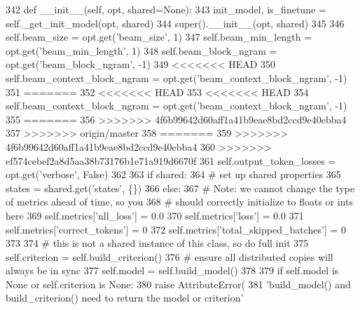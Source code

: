 \begin{DoxyCode}
342     \textcolor{keyword}{def }\_\_init\_\_(self, opt, shared=None):
343         init\_model, is\_finetune = self.\_get\_init\_model(opt, shared)
344         super().\_\_init\_\_(opt, shared)
345 
346         self.beam\_size = opt.get(\textcolor{stringliteral}{'beam\_size'}, 1)
347         self.beam\_min\_length = opt.get(\textcolor{stringliteral}{'beam\_min\_length'}, 1)
348         self.beam\_block\_ngram = opt.get(\textcolor{stringliteral}{'beam\_block\_ngram'}, -1)
349 <<<<<<< HEAD
350         self.beam\_context\_block\_ngram = opt.get(\textcolor{stringliteral}{'beam\_context\_block\_ngram'}, -1)
351 =======
352 <<<<<<< HEAD
353 <<<<<<< HEAD
354         self.beam\_context\_block\_ngram = opt.get(\textcolor{stringliteral}{'beam\_context\_block\_ngram'}, -1)
355 =======
356 >>>>>>> 4f6b99642d60aff1a41b9eae8bd2ccd9e40ebba4
357 >>>>>>> origin/master
358 =======
359 >>>>>>> 4f6b99642d60aff1a41b9eae8bd2ccd9e40ebba4
360 >>>>>>> ef574cebef2a8d5aa38b73176b1e71a919d6670f
361         self.output\_token\_losses = opt.get(\textcolor{stringliteral}{'verbose'}, \textcolor{keyword}{False})
362 
363         \textcolor{keywordflow}{if} shared:
364             \textcolor{comment}{# set up shared properties}
365             states = shared.get(\textcolor{stringliteral}{'states'}, \{\})
366         \textcolor{keywordflow}{else}:
367             \textcolor{comment}{# Note: we cannot change the type of metrics ahead of time, so you}
368             \textcolor{comment}{# should correctly initialize to floats or ints here}
369             self.metrics[\textcolor{stringliteral}{'nll\_loss'}] = 0.0
370             self.metrics[\textcolor{stringliteral}{'loss'}] = 0.0
371             self.metrics[\textcolor{stringliteral}{'correct\_tokens'}] = 0
372             self.metrics[\textcolor{stringliteral}{'total\_skipped\_batches'}] = 0
373 
374             \textcolor{comment}{# this is not a shared instance of this class, so do full init}
375             self.criterion = self.build\_criterion()
376             \textcolor{comment}{# ensure all distributed copies will always be in sync}
377             self.model = self.build\_model()
378 
379             \textcolor{keywordflow}{if} self.model \textcolor{keywordflow}{is} \textcolor{keywordtype}{None} \textcolor{keywordflow}{or} self.criterion \textcolor{keywordflow}{is} \textcolor{keywordtype}{None}:
380                 \textcolor{keywordflow}{raise} AttributeError(
381                     \textcolor{stringliteral}{'build\_model() and build\_criterion() need to return the model or criterion'}

\end{DoxyCode}
